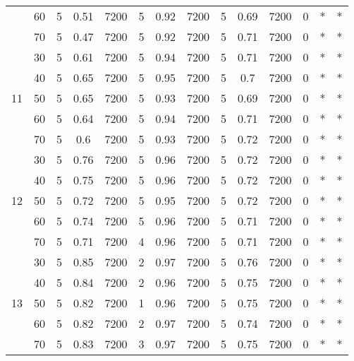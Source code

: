 \documentclass{itor}
\theoremstyle{definition}
\theoremstyle{remark}
\begin{document}
\begin{table}[htbp]
\begin{tabular}{|c|c|cccccc|cccccc|}
          & 60    & 5     & 0.51  & 7200  & 5     & 0.92  & 7200  & 5     & 0.69  & 7200  & 0     & *     & * \\
          & 70    & 5     & 0.47  & 7200  & 5     & 0.92  & 7200  & 5     & 0.71  & 7200  & 0     & *     & * \\
    \midrule
          & 30    & 5     & 0.61  & 7200  & 5     & 0.94  & 7200  & 5     & 0.71  & 7200  & 0     & *     & * \\
          & 40    & 5     & 0.65  & 7200  & 5     & 0.95  & 7200  & 5     & 0.7   & 7200  & 0     & *     & * \\
    11    & 50    & 5     & 0.65  & 7200  & 5     & 0.93  & 7200  & 5     & 0.69  & 7200  & 0     & *     & * \\
          & 60    & 5     & 0.64  & 7200  & 5     & 0.94  & 7200  & 5     & 0.71  & 7200  & 0     & *     & * \\
          & 70    & 5     & 0.6   & 7200  & 5     & 0.93  & 7200  & 5     & 0.72  & 7200  & 0     & *     & * \\
    \midrule
          & 30    & 5     & 0.76  & 7200  & 5     & 0.96  & 7200  & 5     & 0.72  & 7200  & 0     & *     & * \\
          & 40    & 5     & 0.75  & 7200  & 5     & 0.96  & 7200  & 5     & 0.72  & 7200  & 0     & *     & * \\
    12    & 50    & 5     & 0.72  & 7200  & 5     & 0.95  & 7200  & 5     & 0.72  & 7200  & 0     & *     & * \\
          & 60    & 5     & 0.74  & 7200  & 5     & 0.96  & 7200  & 5     & 0.71  & 7200  & 0     & *     & * \\
          & 70    & 5     & 0.71  & 7200  & 4     & 0.96  & 7200  & 5     & 0.71  & 7200  & 0     & *     & * \\
    \midrule
          & 30    & 5     & 0.85  & 7200  & 2     & 0.97  & 7200  & 5     & 0.76  & 7200  & 0     & *     & * \\
          & 40    & 5     & 0.84  & 7200  & 2     & 0.96  & 7200  & 5     & 0.75  & 7200  & 0     & *     & * \\
    13    & 50    & 5     & 0.82  & 7200  & 1     & 0.96  & 7200  & 5     & 0.75  & 7200  & 0     & *     & * \\
          & 60    & 5     & 0.82  & 7200  & 2     & 0.97  & 7200  & 5     & 0.74  & 7200  & 0     & *     & * \\
          & 70    & 5     & 0.83  & 7200  & 3     & 0.97  & 7200  & 5     & 0.75  & 7200  & 0     & *     & * \\

\end{tabular}
\end{table}
\end{document}
